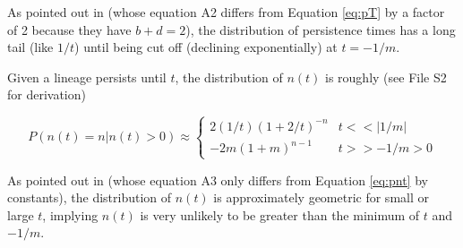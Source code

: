 \documentclass[9pt,twocolumn,twoside,lineno]{gsajnl}
\begin{document}
\noindent As pointed out in \cite{Weissman2010} (whose equation A2 differs from Equation \ref{eq:pT} by a factor of 2 because they have $b+d=2$), the distribution of persistence times has a long tail (like $1/t$) until being cut off (declining exponentially) at $t=-1/m$.

Given a lineage persists until $t$, the distribution of $n(t)$ is roughly (see File S2 for derivation)

\begin{equation}\label{eq:pnt}
P( n(t) = n | n(t) > 0 ) \approx 
\begin{cases}
	2 (1/t) (1 + 2/t)^{-n} & t << |1/m| \\
	-2 m (1 + m)^{n-1} & t >> -1/m > 0
\end{cases}
\end{equation}

\noindent As pointed out in \cite{Weissman2010} (whose equation A3 only differs from Equation \ref{eq:pnt} by constants), the distribution of $n(t)$ is approximately geometric for small or large $t$, implying $n(t)$ is very unlikely to be greater than the minimum of $t$ and $-1/m$.
\end{document}
